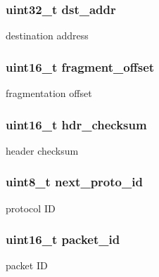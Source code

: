 \subsubsection[{dst\+\_\+addr}]{\setlength{\rightskip}{0pt plus 5cm}uint32\+\_\+t dst\+\_\+addr}\label{structipv4__hdr_ad3367f6b5057b9c73b012338e5a437ae}
destination address \hypertarget{structipv4__hdr_a5e6d9f74c7f28441e7adf6ae4867cc78}{}
\subsubsection[{fragment\+\_\+offset}]{\setlength{\rightskip}{0pt plus 5cm}uint16\+\_\+t fragment\+\_\+offset}\label{structipv4__hdr_a5e6d9f74c7f28441e7adf6ae4867cc78}
fragmentation offset \hypertarget{structipv4__hdr_ab900fdcbfb9fd1da87d839741353acd0}{}
\subsubsection[{hdr\+\_\+checksum}]{\setlength{\rightskip}{0pt plus 5cm}uint16\+\_\+t hdr\+\_\+checksum}\label{structipv4__hdr_ab900fdcbfb9fd1da87d839741353acd0}
header checksum \hypertarget{structipv4__hdr_a513eb1be3a24fe8df91530edd4517ade}{}
\subsubsection[{next\+\_\+proto\+\_\+id}]{\setlength{\rightskip}{0pt plus 5cm}uint8\+\_\+t next\+\_\+proto\+\_\+id}\label{structipv4__hdr_a513eb1be3a24fe8df91530edd4517ade}
protocol I\+D \hypertarget{structipv4__hdr_ad051e090f3817f4549df7dc178790f45}{}
\subsubsection[{packet\+\_\+id}]{\setlength{\rightskip}{0pt plus 5cm}uint16\+\_\+t packet\+\_\+id}\label{structipv4__hdr_ad051e090f3817f4549df7dc178790f45}
packet I\+D \hypertarget{structipv4__hdr_a6a462ff6ecd832025b4f8934f226d5b5}{}
